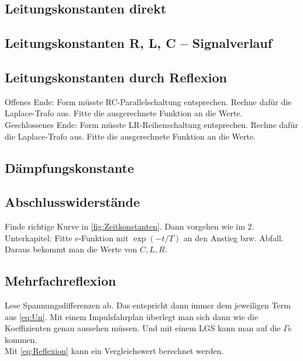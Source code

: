 \subsection{Leitungskonstanten direkt}
\clearpage
\subsection{Leitungskonstanten R, L, C -- Signalverlauf}

\clearpage
\subsection{Leitungskonstanten durch Reflexion}
Offenes Ende: Form müsste RC-Parallelschaltung entsprechen. Rechne dafür die Laplace-Trafo aus. Fitte die ausgerechnete Funktion an die Werte. \\
Geschlossenes Ende: Form müsste LR-Reihenschaltung entsprechen. Rechne dafür die Laplace-Trafo aus. Fitte die ausgerechnete Funktion an die Werte.
\subsection{Dämpfungskonstante}

\subsection{Abschlusswiderstände}
Finde richtige Kurve in \ref{fig:Zeitkonstanten}. Dann vorgehen wie im 2. Unterkapitel: Fitte e-Funktion mit $\exp(-t/T)$ an den Anstieg bzw. Abfall. Daraus bekommt man die Werte von $C,L,R$.
\clearpage
\subsection{Mehrfachreflexion}
Lese Spannungsdifferenzen ab. Das entspricht dann immer dem jeweiligen Term aus \eqref{eq:Un}. Mit einem Impulsfahrplan überlegt man sich dann wie die Koeffizienten genau aussehen müssen. Und mit einem LGS kann man auf die $\Gamma$s kommen. \\
Mit \eqref{eq:Reflexion} kann ein Vergleichswert berechnet werden.


